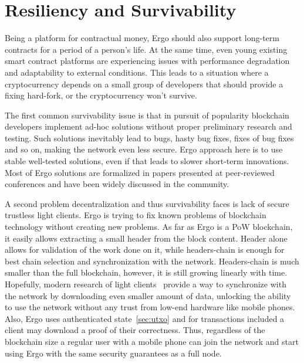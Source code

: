 \section{Resiliency and Survivability}
\label{sec:survivability}

Being a platform for contractual money, Ergo should also support long-term contracts for a
period of a person's life.
At the same time, even young existing smart contract platforms are experiencing issues with performance degradation and
adaptability to external conditions.
This leads to a situation where a cryptocurrency depends on a small group of developers
that should provide a fixing hard-fork, or the cryptocurrency won't survive.

The first common survivability issue is that in pursuit of popularity blockchain developers implement ad-hoc
solutions without proper preliminary research and testing.
Such solutions inevitably lead to bugs, hasty bug fixes, fixes of bug fixes and so on, making the network even less secure.
Ergo approach here is to use stable well-tested solutions, even if that leads to slower
short-term innovations.
Most of Ergo solutions are formalized in papers presented at peer-reviewed conferences
and have been widely discussed in the community.

A second problem decentralization and thus survivability faces is lack of secure trustless light clients.
Ergo is trying to fix known problems of blockchain technology without creating new problems.
As far as Ergo is a PoW blockchain, it easily allows extracting a small header from the block content.
Header alone allows for validation of the work done on it, while headers-chain is enough for best chain selection
and synchronization with the network.
Headers-chain is much smaller than the full blockchain, however, it is still growing linearly with time.
Hopefully, modern research of light clients~\cite{kiayias2017non,luuflyclient} provide a way to
synchronize with the network by downloading even smaller amount of data, unlocking the ability to
use the network without any trust from low-end hardware like mobile phones.
Also, Ergo uses authenticated state~\ref{sec:utxo} and for transactions included
a client may download a proof of their correctness.
Thus, regardless of the blockchain size a regular user with
a mobile phone can join the network and start using Ergo with the same security
guarantees as a full node.

